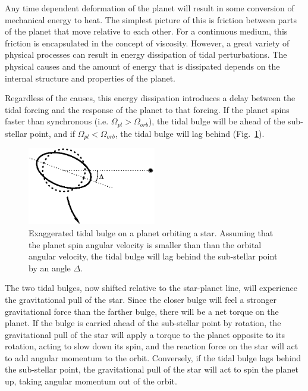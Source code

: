 Any time dependent deformation of the planet will result in some conversion of
mechanical energy to heat. The simplest picture of this is friction between
parts of the planet that move relative to each other. For a continuous medium,
this friction is encapsulated in the concept of viscosity. However, a great
variety of physical processes can result in energy dissipation of tidal
perturbations. The physical causes and the amount of energy that is dissipated
depends on the internal structure and properties of the planet.

Regardless of the causes, this energy dissipation introduces a delay between the
tidal forcing and the response of the planet to that forcing. If the planet
spins faster than synchronous (i.e.  $\Omega_{pl} > \Omega_{orb}$), the tidal
bulge will be ahead of the sub-stellar point, and if $\Omega_{pl} <
\Omega_{orb}$, the tidal bulge will lag behind (Fig.~\ref{fig:tidal_bulge}).

\begin{figure}[t]
%
    \centering
%
    \includegraphics[width=0.5\textwidth]{tidal_bulge.eps}
%
    \caption{
%
        Exaggerated tidal bulge on a planet orbiting a star. Assuming that the
        planet spin angular velocity is smaller than than the orbital angular
        velocity, the tidal bulge will lag behind the sub-stellar point by an
        angle $\Delta$.
%
    }
%
    \label{fig:tidal_bulge}
%
\end{figure}

The two tidal bulges, now shifted relative to the star-planet line, will
experience the gravitational pull of the star. Since the closer bulge will feel
a stronger gravitational force than the farther bulge, there will be a net
torque on the planet. If the bulge is carried ahead of the sub-stellar point by
rotation, the gravitational pull of the star will apply a torque to the planet
opposite to its rotation, acting to slow down its spin, and the reaction force
on the star will act to add angular momentum to the orbit. Conversely, if the
tidal bulge lags behind the sub-stellar point, the gravitational pull of the
star will act to spin the planet up, taking angular momentum out of the orbit.

